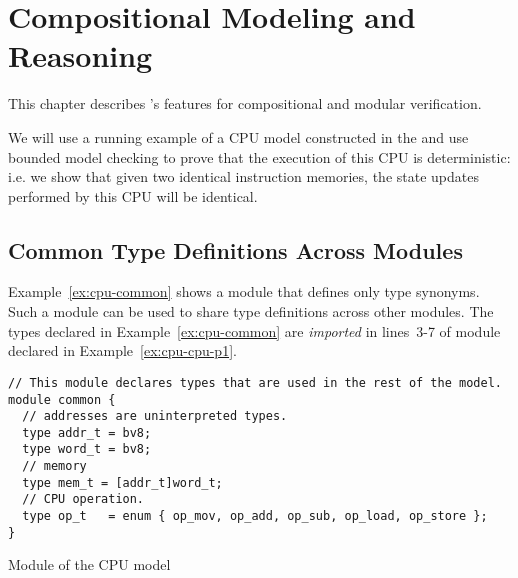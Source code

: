 \chapter{Compositional Modeling and Reasoning}
\label{ch:compositional}

This chapter describes \uclid{}'s features for compositional and modular verification.

We will use a running example of a CPU model constructed in the \uclid{} and use bounded model checking to prove that the execution of this CPU is deterministic: i.e. we show that given two identical instruction memories, the state updates performed by this CPU will be identical.

\section{Common Type Definitions Across Modules}
Example~\ref{ex:cpu-common} shows a module that defines only type synonyms. Such a module can be used to share type definitions across other modules. The types declared in Example~\ref{ex:cpu-common} are \emph{imported} in lines~3-7 of module  declared in Example~\ref{ex:cpu-cpu-p1}.

\label{sec:cpu-model}
\begin{uclidlisting}[htbp]
\begin{lstlisting}[language=uclid,style=uclidstyle]
// This module declares types that are used in the rest of the model.
module common {
  // addresses are uninterpreted types.
  type addr_t = bv8;
  type word_t = bv8;
  // memory
  type mem_t = [addr_t]word_t;
  // CPU operation.
  type op_t   = enum { op_mov, op_add, op_sub, op_load, op_store };
}
\end{lstlisting}
\caption{Module  of the CPU model}
\label{ex:cpu-common}
\end{uclidlisting}

